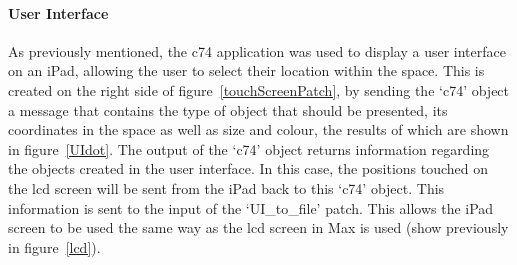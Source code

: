 \documentclass[../../main.tex]{subfiles}
\begin{document}
		\paragraph{User Interface}
			As previously mentioned, the c74 application was used to display a user interface on an iPad, allowing the user to select their location within the space. This is created on the right side of figure~\ref{touchScreenPatch}, by sending the `c74' object a message that contains the type of object that should be presented, its coordinates in the space as well as size and colour, the results of which are shown in figure~\ref{UIdot}. The output of the `c74' object returns information regarding the objects created in the user interface. In this case, the positions touched on the lcd screen will be sent from the iPad back to this `c74' object. This information is sent to the input of the `UI\_to\_file' patch. This allows the iPad screen to be used the same way as the lcd screen in Max is used (show previously in figure~\ref{lcd}).
\end{document}
